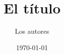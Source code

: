 \documentclass[notitlepage,11pt]{article} %
\begin{document}
\title{El título}
\author{Los autores}

\date{\today}
\maketitle %
\end{document}
